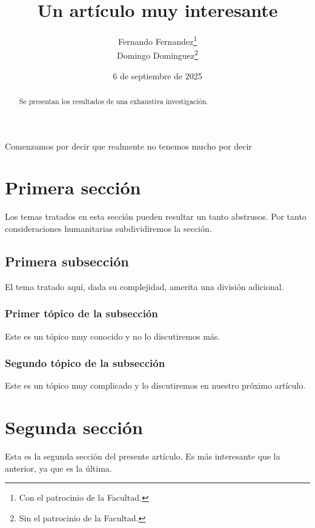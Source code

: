 \documentclass[10pt]{article}
\title{Un artículo muy interesante}
\author{Fernando Fernandez\thanks{Con el patrocinio de la Facultad.}\\
	Domingo Dominguez\thanks{Sin el patrocinio de la Facultad.}}
\date{6 de septiembre de 2025}
\begin{document}
\maketitle

\begin{abstract}
	Se presentan los resultados de una exhaustiva investigación.
\end{abstract}

Comenzamos por decir que realmente no tenemos mucho por decir

\section{Primera sección}
Los temas tratados en esta sección pueden resultar un tanto abstrusos.
Por tanto consideraciones humanitarias subdividiremos la sección.

\subsection{Primera subsección}
El tema tratado aquí, dada su complejidad, amerita una
división adicional.

\subsubsection{Primer tópico de la subsección}
Este es un tópico muy conocido y no lo discutiremos más.

\subsubsection{Segundo tópico de la subsección}
Este es un tópico muy complicado y lo discutiremos en nuestro
próximo artículo.

\section{Segunda sección}
Esta es la segunda sección del presente artículo.
Es más interesante que la anterior, ya que es la última.
\end{document}
